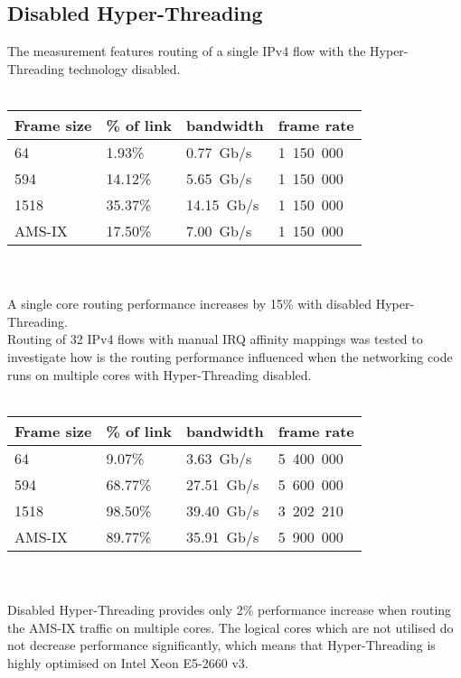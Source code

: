 
\subsection{Disabled Hyper-Threading}
The measurement features routing of a single IPv4 flow with the Hyper-Threading technology disabled.
\\
\\
\begin{tabular}{ | l | l | l | l | }
\hline
Frame size & \% of link & bandwidth & frame rate \\
\hline
64     &  1.93\% &  0.77~Gb/s & 1~150~000 \\
594    & 14.12\% &  5.65~Gb/s & 1~150~000 \\
1518   & 35.37\% & 14.15~Gb/s & 1~150~000 \\
AMS-IX & 17.50\% &  7.00~Gb/s & 1~150~000 \\
\hline
\end{tabular}
\\
\\
A single core routing performance increases by 15\% with disabled Hyper-Threading.
\\
Routing of 32 IPv4 flows with manual IRQ affinity mappings was tested to investigate
how is the routing performance influenced when the networking code runs
on multiple cores with Hyper-Threading disabled.
\\
\\
\begin{tabular}{ | l | l | l | l | }
\hline
Frame size & \% of link & bandwidth & frame rate \\
\hline
64     &  9.07\% &  3.63~Gb/s & 5~400~000 \\
594    & 68.77\% & 27.51~Gb/s & 5~600~000 \\
1518   & 98.50\% & 39.40~Gb/s & 3~202~210 \\
AMS-IX & 89.77\% & 35.91~Gb/s & 5~900~000 \\
\hline
\end{tabular}
\\
\\
Disabled Hyper-Threading provides only 2\% performance increase when routing the AMS-IX traffic on multiple cores.
The logical cores which are not utilised do not decrease performance significantly,
which means that Hyper-Threading is highly optimised on Intel Xeon E5-2660 v3.
